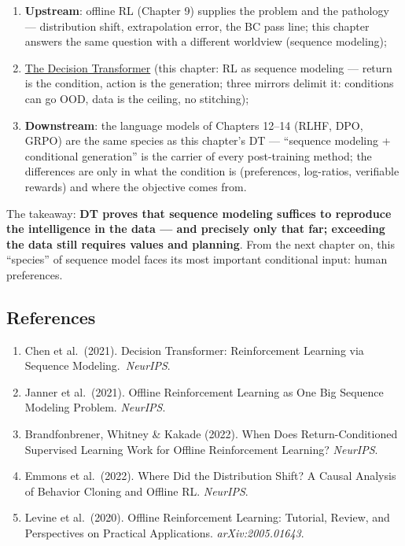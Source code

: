 \documentclass{article}
\begin{document}
\begin{enumerate}
  \item \textbf{Upstream}: offline RL (Chapter 9) supplies the problem and the pathology --- distribution shift, extrapolation error, the BC pass line; this chapter answers the same question with a different worldview (sequence modeling);
  \item \underline{The Decision Transformer} (this chapter: RL as sequence modeling --- return is the condition, action is the generation; three mirrors delimit it: conditions can go OOD, data is the ceiling, no stitching);
  \item \textbf{Downstream}: the language models of Chapters 12--14 (RLHF, DPO, GRPO) are the same species as this chapter's DT --- ``sequence modeling + conditional generation'' is the carrier of every post-training method; the differences are only in what the condition is (preferences, log-ratios, verifiable rewards) and where the objective comes from.
\end{enumerate}

The takeaway: \textbf{DT proves that sequence modeling suffices to reproduce the intelligence in the data --- and precisely only that far; exceeding the data still requires values and planning}. From the next chapter on, this ``species'' of sequence model faces its most important conditional input: human preferences.

\subsection*{References}

\begin{enumerate}
  \item Chen et al.\ (2021). Decision Transformer: Reinforcement Learning via Sequence Modeling.\allowbreak\ \textit{NeurIPS}.
  \item Janner et al.\ (2021). Offline Reinforcement Learning as One Big Sequence Modeling Problem. \textit{NeurIPS}.
  \item Brandfonbrener, Whitney \& Kakade (2022). When Does Return-Conditioned Supervised Learning Work for Offline Reinforcement Learning? \textit{NeurIPS}.
  \item Emmons et al.\ (2022). Where Did the Distribution Shift? A Causal Analysis of Behavior Cloning and Offline RL. \textit{NeurIPS}.
  \item Levine et al.\ (2020). Offline Reinforcement Learning: Tutorial, Review, and Perspectives on Practical Applications. \textit{arXiv:2005.01643}.
\end{enumerate}
\end{document}
